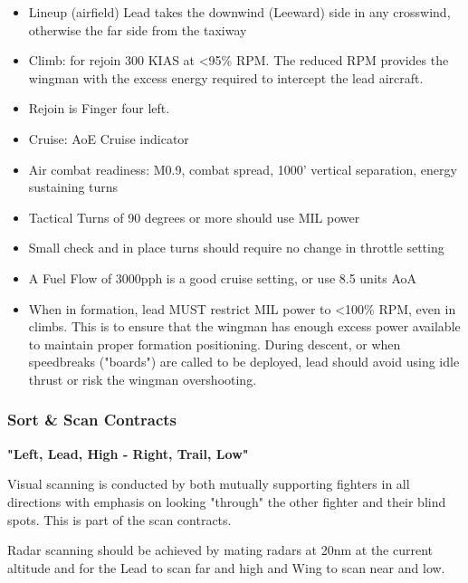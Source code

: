 \begin{itemize}
  \item Lineup (airfield) Lead takes the downwind (Leeward) side in any
    crosswind, otherwise the far side from the taxiway

  \item Climb: for rejoin 300 KIAS at <95\% RPM. The reduced RPM provides the
    wingman with the excess energy required to intercept the lead aircraft.

  \item Rejoin is Finger four left.

  \item Cruise: AoE Cruise indicator

  \item Air combat readiness: M0.9, combat spread, 1000' vertical
    separation, energy sustaining turns

  \item Tactical Turns of 90 degrees or more should use MIL power

  \item Small check and in place turns should require no change in throttle
    setting

  \item A Fuel Flow of 3000pph is a good cruise setting, or use 8.5 units AoA

  \item When in formation, lead MUST restrict MIL power to <100\% RPM, even in
    climbs. This is to ensure that the wingman has enough excess power
    available to maintain proper formation positioning. During descent, or when
    speedbreaks ("boards") are called to be deployed, lead should avoid
    using idle thrust or risk the wingman overshooting.

\end{itemize}

\subsubsection{Sort \& Scan Contracts}
\label{sec:contracts-sort-scan}

\textbf{"Left, Lead, High - Right, Trail, Low"}

Visual scanning is conducted by both mutually supporting fighters in all
directions with emphasis on looking "through" the other fighter and their blind
spots. This is part of the scan contracts.

Radar scanning should be achieved by mating radars at 20nm at the current
altitude and for the Lead to scan far and high and Wing to scan near and low.


